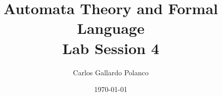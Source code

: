 \newcommand{\subject}{Automata Theory and Formal Language}
\newcommand{\practice}{Lab Session 4}

\title{\subject \\ \practice}
\author{{\large Carlos Gallardo Polanco \texttt{}}
             \\ {\small  }}
\date{\today}
